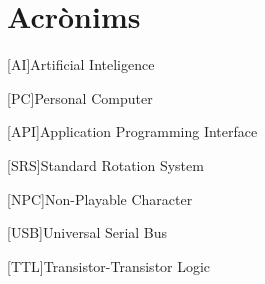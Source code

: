 \chapter{Acrònims} %
%
%
\begin{acronym}

[AI]{Artificial Inteligence}

[PC]{Personal Computer}

[API]{Application Programming Interface}

[SRS]{Standard Rotation System}

[NPC]{Non-Playable Character}

[USB]{Universal Serial Bus}

[TTL]{Transistor-Transistor Logic}

\end{acronym}
